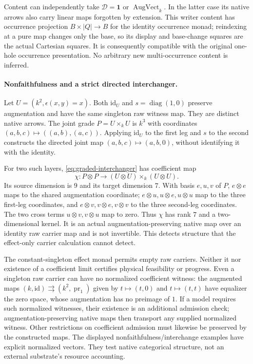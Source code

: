 \documentclass[11pt]{article}
\newcommand{\id}{\mathrm{id}}
\begin{document}
Content can independently take $\mathcal D=\mathbf1$ or $\operatorname{AugVect}_k$. In the latter case its native arrows also carry linear maps forgotten by extension. This writer content has occurrence projection $B\times|Q|\to B$ for the identity occurrence monad; reindexing at a pure map changes only the base, so its display and base-change squares are the actual Cartesian squares. It is consequently compatible with the original one-hole occurrence presentation. No arbitrary new multi-occurrence content is inferred.

\paragraph{Nonfaithfulness and a strict directed interchanger.} Let $U=(k^2,\epsilon(x,y)=x)$. Both $\id_U$ and $s=\operatorname{diag}(1,0)$ preserve augmentation and have the same singleton raw witness map. They are distinct native arrows. The joint grade $P=U\times_kU$ is $k^3$ with coordinates $(a,b,c)\mapsto((a,b),(a,c))$. Applying $\id_U$ to the first leg and $s$ to the second constructs the directed joint map $(a,b,c)\mapsto(a,b,0)$, without identifying it with the identity.

For two such layers, \eqref{eq:graded-interchanger} has coefficient map
\[
 \chi:P\otimes P\longrightarrow(U\otimes U)\times_k(U\otimes U).
\]
Its source dimension is $9$ and its target dimension $7$. With basis $e,u,v$ of $P$, $e\otimes e$ maps to the shared augmentation coordinate; $e\otimes u,u\otimes e,u\otimes u$ map to the three first-leg coordinates, and $e\otimes v,v\otimes e,v\otimes v$ to the three second-leg coordinates. The two cross terms $u\otimes v,v\otimes u$ map to zero. Thus $\chi$ has rank $7$ and a two-dimensional kernel. It is an actual augmentation-preserving native map over an identity raw carrier map and is not invertible. This detects structure that the effect-only carrier calculation cannot detect.

The constant-singleton effect monad permits empty raw carriers. Neither it nor existence of a coefficient limit certifies physical feasibility or progress. Even a singleton raw carrier can have no normalized coefficient witness: the augmented maps $(k,\id)\rightrightarrows(k^2,\operatorname{pr}_1)$ given by $t\mapsto(t,0)$ and $t\mapsto(t,t)$ have equalizer the zero space, whose augmentation has no preimage of $1$. If a model requires such normalized witnesses, their existence is an additional admission check; augmentation-preserving native maps then transport any supplied normalized witness. Other restrictions on coefficient admission must likewise be preserved by the constructed maps. The displayed nonfaithfulness/interchange examples have explicit normalized vectors. They test native categorical structure, not an external substrate's resource accounting.
\end{document}
